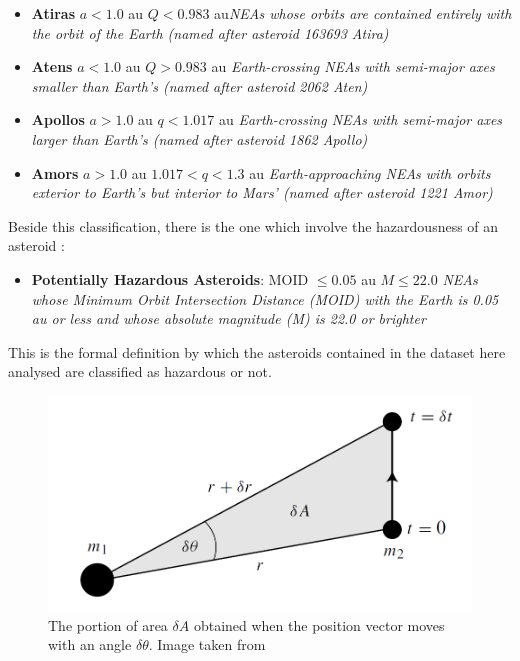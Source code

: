 \documentclass[12pt,%
               a4paper,%
               oneside,openany,%
               titlepage,%
               headinclude,footinclude,%
               BCOR5mm,%
               cleardoublepage=empty,%
               tablecaptionabove,%
               floatperchapter,
               ]{scrreprt}                 %
\begin{document}
\begin{itemize}
\item \textbf{Atiras} $a < 1.0$ au $Q < 0.983$ au\quad \textit{NEAs whose orbits are contained entirely with the orbit of the Earth (named after asteroid 163693 Atira)}
\item \textbf{Atens} $a < 1.0$ au $Q > 0.983$ au \quad \textit{Earth-crossing NEAs with semi-major axes smaller than Earth's (named after asteroid 2062 Aten)}
\item \textbf{Apollos} $a>1.0$ au $q<1.017$ au \quad  \textit{Earth-crossing NEAs with semi-major axes larger than Earth's (named after asteroid 1862 Apollo) }
\item \textbf{Amors} $a>1.0$ au $1.017<q<1.3$ au \textit{Earth-approaching NEAs with orbits exterior to Earth's but interior to Mars' (named after asteroid 1221 Amor)}
\end{itemize}

Beside this classification, there is the one which involve the hazardousness of an asteroid \cite{nasa_classification}:

\begin{itemize}
\item \textbf{Potentially Hazardous Asteroids}: MOID $\leq 0.05$ au $M \leq22.0$ \textit{NEAs whose Minimum Orbit Intersection Distance (MOID) with the Earth is 0.05 au or less and whose absolute magnitude (M) is 22.0 or brighter}
\end{itemize}

This is the formal definition by which the asteroids contained in the dataset here analysed are classified as hazardous or not. 

\begin{figure}[h]
\begin{center}
\includegraphics[width=1\textwidth]{Figures/Area_dynamics.png}
\caption{The portion of area $\delta A$ obtained when the position vector moves with an angle $\delta\theta$. Image taken from \cite{murray1999solar}}
\label{Area_dynamics}
\end{center}
\end{figure}
\end{document}
